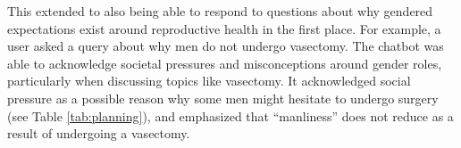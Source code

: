 This extended to also being able to respond to questions about why gendered expectations exist around reproductive health in the first place.
For example, a user asked a query about why men do not undergo vasectomy. The chatbot was able to acknowledge societal pressures and misconceptions around gender roles, particularly when discussing topics like vasectomy. It acknowledged social pressure as a possible reason why some men might hesitate to undergo surgery (see Table \ref{tab:planning}), and emphasized that ``manliness'' does not reduce as a result of undergoing a vasectomy. 



